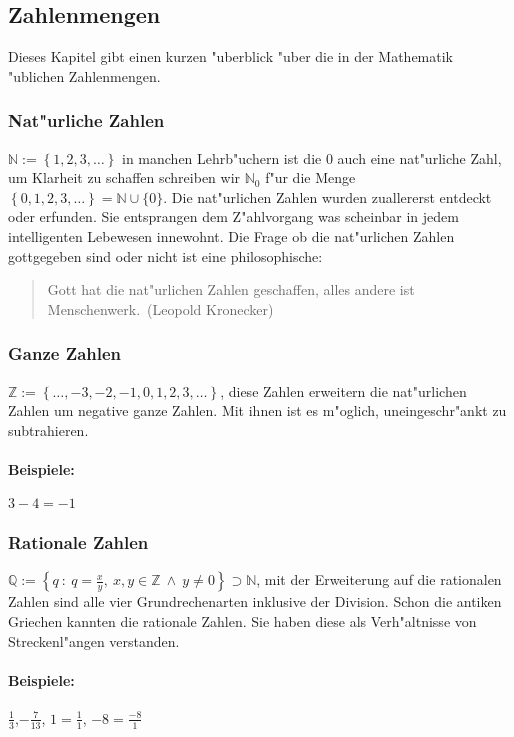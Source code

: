 \subsection{Zahlenmengen}
Dieses Kapitel gibt einen kurzen "uberblick "uber die in der Mathematik "ublichen Zahlenmengen.

\subsubsection{Nat"urliche Zahlen}
$\mathbb{N} := \left\{1, 2, 3, \ldots \right\}$ in manchen Lehrb"uchern ist die $0$ auch eine nat"urliche Zahl, um Klarheit zu schaffen schreiben wir $\mathbb{N}_0$ f"ur die Menge $\left\{0, 1, 2, 3, \ldots \right\} = \mathbb{N} \cup \{0\}$. Die nat"urlichen Zahlen wurden zuallererst entdeckt oder erfunden. Sie entsprangen dem Z"ahlvorgang was scheinbar in jedem intelligenten Lebewesen innewohnt. Die Frage ob die nat"urlichen Zahlen gottgegeben sind oder nicht ist eine philosophische:
\begin{quote}
\glqq Gott hat die nat"urlichen Zahlen geschaffen, alles andere ist Menschenwerk.\grqq \ (Leopold Kronecker)
\end{quote}

\subsubsection{Ganze Zahlen}
$\mathbb{Z} := \left\{\ldots, -3, -2, -1, 0, 1, 2, 3, \ldots \right\}$, diese Zahlen erweitern die nat"urlichen Zahlen um negative ganze Zahlen. Mit ihnen ist es m"oglich, uneingeschr"ankt zu subtrahieren.
\paragraph{Beispiele: } $3 - 4 = -1$

\subsubsection{Rationale Zahlen}
$\mathbb{Q} := \left\{ q \  : \ q = \frac{x}{y}, \ x,y \in \mathbb{Z} \  \land \ y \neq 0 \right\} \supset \mathbb{N}$, mit der Erweiterung auf die rationalen Zahlen sind alle vier Grundrechenarten inklusive der Division. Schon die antiken Griechen kannten die rationale Zahlen. Sie haben diese als Verh"altnisse von Streckenl"angen verstanden.
\paragraph{Beispiele: } $\frac{1}{3}$,$-\frac{7}{13}$, $1 = \frac{1}{1}$, $-8 =\frac{-8}{1}$	

